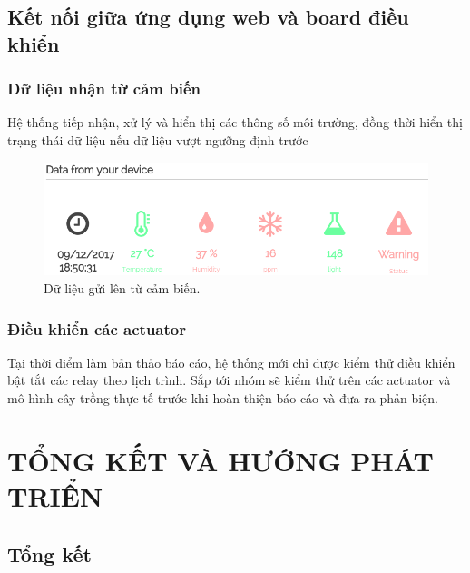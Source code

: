 \documentclass[a4paper,12pt,oneside]{article}
\begin{document}
\subsection{Kết nối giữa ứng dụng web và board điều khiển}

\subsubsection{Dữ liệu nhận từ cảm biến}
\noindent Hệ thống tiếp nhận, xử lý và hiển thị các thông số môi trường, đồng thời hiển thị trạng thái dữ liệu nếu dữ liệu vượt ngưỡng định trước

	\begin{figure}[H]
	\centering
	\includegraphics[scale=.7]{hinh/data.PNG}
	\caption{Dữ liệu gửi lên từ cảm biến.}
	\end{figure}
	
\subsubsection{Điều khiển các actuator}
\noindent Tại thời điểm làm bản thảo báo cáo, hệ thống mới chỉ được kiểm thử điều khiển bật tắt các relay theo lịch trình. Sắp tới nhóm sẽ kiểm thử trên các actuator và mô hình cây trồng thực tế trước khi hoàn thiện báo cáo và đưa ra phản biện.

\newpage
\section{TỔNG KẾT VÀ HƯỚNG PHÁT TRIỂN}
\subsection{Tổng kết}
\end{document}

